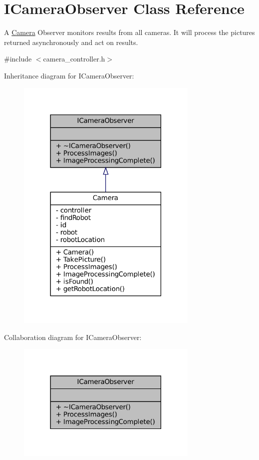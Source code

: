 \hypertarget{classICameraObserver}{}\section{I\+Camera\+Observer Class Reference}
\label{classICameraObserver}


A \hyperlink{classCamera}{Camera} Observer monitors results from all cameras. It will process the pictures returned asynchronously and act on results.  




{\ttfamily \#include $<$camera\+\_\+controller.\+h$>$}



Inheritance diagram for I\+Camera\+Observer\+:\nopagebreak
\begin{figure}[H]
\begin{center}
\leavevmode
\includegraphics[width=246pt]{classICameraObserver__inherit__graph}
\end{center}
\end{figure}


Collaboration diagram for I\+Camera\+Observer\+:\nopagebreak
\begin{figure}[H]
\begin{center}
\leavevmode
\includegraphics[width=246pt]{classICameraObserver__coll__graph}
\end{center}
\end{figure}
